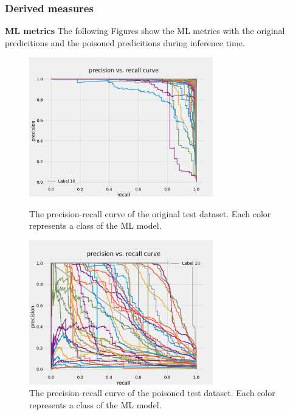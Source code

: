 \subsubsection*{Derived measures}

\noindent\textbf{ML metrics} The following Figures show the ML metrics with the original predicitions and the poisoned predicitions during inference time.

\begin{figure}[!tbp]
  \centering
  \begin{minipage}[b]{0.4\textwidth}
    \includegraphics[width=8cm]{pictures/precision_recall_curve.png}
    \caption{The precision-recall curve of the original test dataset. Each color represents a class of the ML model.}
    \label{fig:precision_recall_curve}
  \end{minipage}
  \hfill
  \begin{minipage}[b]{0.4\textwidth}
    \includegraphics[width=8cm]{pictures/poisoned_precision_recall.png}
    \caption{The precision-recall curve of the poisoned test dataset. Each color represents a class of the ML model.}
    \label{fig:poisoned_precision_recall}
  \end{minipage}
\end{figure}


